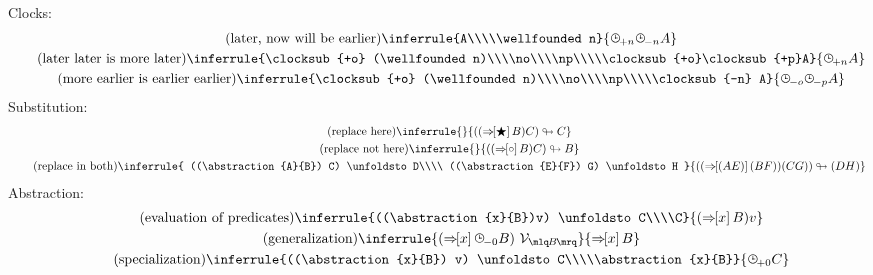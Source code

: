 \documentclass{article}
\begin{document}
  Clocks:
  \begin{gather*}
    \tag{later, now will be earlier}
    \inferrule{A\\\\\wellfounded n}{\clocksub{+n} \clocksub{-n} A}\\
    \tag{later later is more later}
    \inferrule{\clocksub{+o} (\wellfounded n)\\\\no\\\\np\\\\\clocksub{+o}\clocksub{+p}A}{\clocksub{+n} A}\\
    \tag{more earlier is earlier earlier}
    \inferrule{\clocksub{+o} (\wellfounded n)\\\\no\\\\np\\\\\clocksub{-n} A}{\clocksub{-o}\clocksub{-p}A}\\
  \end{gather*}
  Substitution:
  \begin{gather*}
    \tag{replace here}
    \inferrule{}{((\abstraction{\here}{B}) C) \unfoldsto C}\\
    \tag{replace not here}
    \inferrule{}{((\abstraction{\hole}{B}) C) \unfoldsto B}\\
    \tag{replace in both}
    \inferrule{
      ((\abstraction{A}{B}) C) \unfoldsto D\\\\
      ((\abstraction{E}{F}) G) \unfoldsto H
    }{
      ((\abstraction{(AE)}{(BF)}) (CG)) \unfoldsto (DH)
    }\\
  \end{gather*}
  Abstraction:
  \begin{gather*}
    \tag{evaluation of predicates}
    \inferrule{((\abstraction{x}{B})v) \unfoldsto C\\\\C}{(\abstraction{x}{B})v}\\
    \tag{generalization}
    \inferrule{(\abstraction{x}{\clocksub{-\wfz}B})\ \variable{B}}{\abstraction{x}{B}}\\
    \tag{specialization}
    \inferrule{((\abstraction{x}{B}) v) \unfoldsto C\\\\\abstraction{x}{B}}{\clocksub{+\wfz} C}\\
  \end{gather*}
\end{document}
